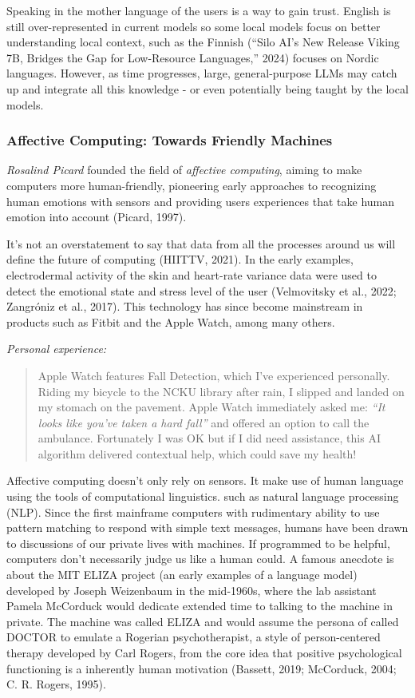 \documentclass[
  letterpaper,
  DIV=11,
  numbers=noendperiod]{scrartcl}
\begin{document}
Speaking in the mother language of the users is a way to gain trust.
English is still over-represented in current models so some local models
focus on better understanding local context, such as the Finnish
({``Silo {AI}'s New Release {Viking 7B}, Bridges the Gap for
Low-Resource Languages,''} 2024) focuses on Nordic languages. However,
as time progresses, large, general-purpose LLMs may catch up and
integrate all this knowledge - or even potentially being taught by the
local models.

\subsubsection{Affective Computing: Towards Friendly
Machines}\label{affective-computing-towards-friendly-machines}

\emph{Rosalind Picard} founded the field of \emph{affective computing},
aiming to make computers more human-friendly, pioneering early
approaches to recognizing human emotions with sensors and providing
users experiences that take human emotion into account (Picard, 1997).

It's not an overstatement to say that data from all the processes around
us will define the future of computing (HIITTV, 2021). In the early
examples, electrodermal activity of the skin and heart-rate variance
data were used to detect the emotional state and stress level of the
user (Velmovitsky et al., 2022; Zangróniz et al., 2017). This technology
has since become mainstream in products such as Fitbit and the Apple
Watch, among many others.

\emph{Personal experience:}

\begin{quote}
Apple Watch features Fall Detection, which I've experienced personally.
Riding my bicycle to the NCKU library after rain, I slipped and landed
on my stomach on the pavement. Apple Watch immediately asked me:
\emph{``It looks like you've taken a hard fall''} and offered an option
to call the ambulance. Fortunately I was OK but if I did need
assistance, this AI algorithm delivered contextual help, which could
save my health!
\end{quote}

Affective computing doesn't only rely on sensors. It make use of human
language using the tools of computational linguistics. such as natural
language processing (NLP). Since the first mainframe computers with
rudimentary ability to use pattern matching to respond with simple text
messages, humans have been drawn to discussions of our private lives
with machines. If programmed to be helpful, computers don't necessarily
judge us like a human could. A famous anecdote is about the MIT ELIZA
project (an early examples of a language model) developed by Joseph
Weizenbaum in the mid-1960s, where the lab assistant Pamela McCorduck
would dedicate extended time to talking to the machine in private. The
machine was called ELIZA and would assume the persona of called DOCTOR
to emulate a Rogerian psychotherapist, a style of person-centered
therapy developed by Carl Rogers, from the core idea that positive
psychological functioning is a inherently human motivation (Bassett,
2019; McCorduck, 2004; C. R. Rogers, 1995).
\end{document}

